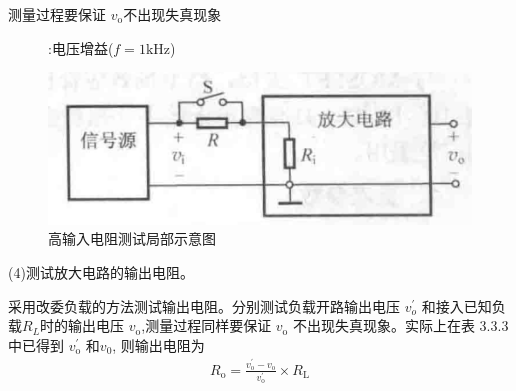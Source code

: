 \documentclass[a4paper,11pt,UTF8]{article}
\numberwithin{equation}{subsection}
\begin{document}
测量过程要保证 $v_{\mathrm{o}}$不出现失真现象
\begin{figure}[H]
	\begin{minipage}[h]{0.6\textwidth}
		\centering
		\captionsetup{labelsep=space, textformat=simple, format=plain} 
		\renewcommand{\figurename}{表}  
		\caption{:电压增益($f\mathrm{=}\mathrm{1kHz}$)}
	\end{minipage}
	\begin{minipage}[h]{0.4\textwidth}
		\centering
		\includegraphics[width=\textwidth]{2.3}
		\caption{高输入电阻测试局部示意图}
	\end{minipage}
\end{figure}

(4)测试放大电路的输出电阻。

采用改委负载的方法测试输出电阻。分别测试负载开路输出电压 $v_o^{\prime}$ 和接入已知负载$R_L$时的输出电压 $v_\mathrm{o}$,测量过程同样要保证 $v_\mathrm{o}$ 不出现失真现象。实际上在表 3.3.3 中已得到 $v_\mathrm{o}^{\prime}$ 和$v_0$, 则输出电阻为
\begin{align}
	R_\mathrm{o}=\frac{v_\mathrm{o}^{\prime}-v_\mathrm{o}}{v_\mathrm{o}^{\prime}}\times R_\mathrm{L}
\end{align}
\end{document}
